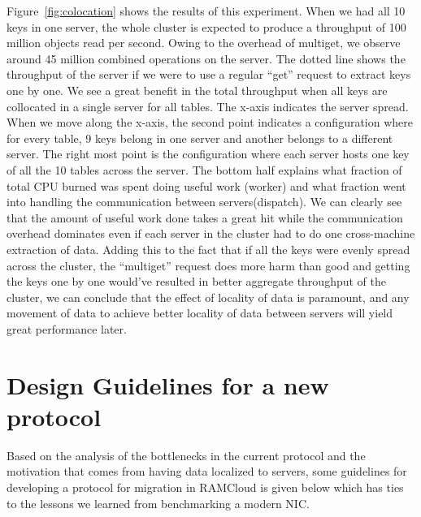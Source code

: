 Figure~\ref{fig:colocation} shows the results of this experiment. When we had all 10 keys in one server, the whole cluster is expected to produce a throughput of 100 million objects read per second.
Owing to the overhead of multiget, we observe around 45 million combined operations on the server. The dotted line shows the throughput of the server if we were to use a regular ``get'' request to extract keys one by one.
We see a great benefit in the total throughput when all keys are collocated in a single server for all tables. The x-axis indicates the server spread. When we move along the x-axis, the second point indicates a configuration where for every table, 9 keys belong in one server and 
another belongs to a different server. The right most point is the configuration where each server hosts one key of all the 10 tables across the server. The bottom half explains what fraction of total CPU burned was spent 
doing useful work (worker) and what fraction went into handling the communication between servers(dispatch). 
We can clearly see that the amount of useful work done takes a great hit while the communication overhead dominates 
even if each server in the cluster had to do one cross-machine extraction of data. Adding this to the fact that if all the keys were evenly spread across the cluster, the ``multiget'' request does more harm than good and getting the 
keys one by one would've resulted in better aggregate throughput of the cluster, we can conclude that the effect of locality of data is paramount, and any movement of data to achieve better locality of data between servers will yield 
great performance later.


\clearpage
\section{Design Guidelines for a new protocol}
Based on the analysis of the bottlenecks in the current protocol and the motivation that comes from having data localized to servers, some guidelines for developing a protocol for migration in RAMCloud
is given below which has ties to the lessons we learned from benchmarking a modern NIC.


